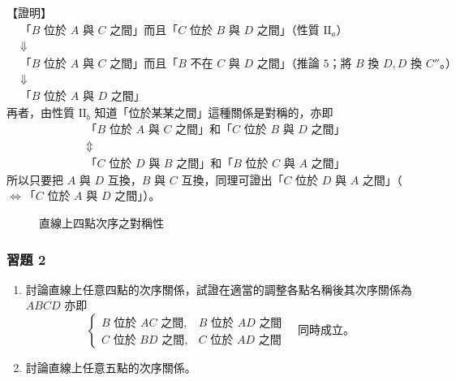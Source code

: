 \noindent【證明】\quad
\begin{align*}
  &\text{「$B$ 位於 $A$ 與 $C$ 之間」而且「$C$ 位於 $B$ 與 $D$ 之間」（性質 $\mathrm{II}_a$）} \\
  &\Downarrow \\
  &\text{「$B$ 位於 $A$ 與 $C$ 之間」而且「$B$ 不在 $C$ 與 $D$ 之間」（推論 5；將 $B$ 換 $D, D$ 換 $C''$。）} \\
  &\Downarrow \\
  &\text{「$B$ 位於 $A$ 與 $D$ 之間」}
\end{align*}
再者，由性質 $\mathrm{II}_b$ 知道「位於某某之間」這種關係是對稱的，亦即
\begin{align*}
  &\text{「$B$ 位於 $A$ 與 $C$ 之間」和「$C$ 位於 $B$ 與 $D$ 之間」} \\
  &\Updownarrow \\
  &\text{「$C$ 位於 $D$ 與 $B$ 之間」和「$B$ 位於 $C$ 與 $A$ 之間」}
\end{align*}
所以只要把 $A$ 與 $D$ 互換，$B$ 與 $C$ 互換，同理可證出「$C$ 位於 $D$ 與 $A$ 之間」（$\Longleftrightarrow$「$C$ 位於 $A$ 與 $D$ 之間」）。

\begin{figure}[H]
\centering
{}
\caption{直線上四點次序之對稱性}
\label{fig:b3s-a1-11}
\end{figure}

\subsubsection*{習題 2}
\begin{enumerate}[1., leftmargin=2em]
  \item 討論直線上任意四點的次序關係，試證在適當的調整各點名稱後其次序關係為 $ABCD$ 亦即
  \[
  \begin{cases}
    B \text{ 位於 } AC \text{ 之間}, & B \text{ 位於 } AD \text{ 之間} \\
    C \text{ 位於 } BD \text{ 之間}, & C \text{ 位於 } AD \text{ 之間}
  \end{cases}
  \quad \text{同時成立。}
  \]
  \item 討論直線上任意五點的次序關係。
\end{enumerate}

